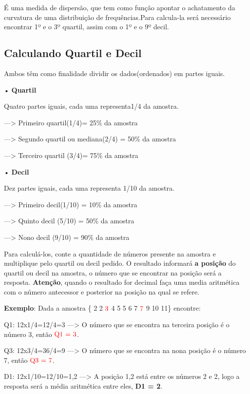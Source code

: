 \documentclass[]{book}
\begin{document}
É uma medida de dispersão, que tem como função apontar o achatamento da curvatura de uma distribuição de frequências.Para calcula-la será necessário encontrar 1º e o 3º quartil, assim com o 1º e o 9º decil.

\hypertarget{calculando-quartil-e-decil}{%
\subsection{\texorpdfstring{\textbf{Calculando Quartil e Decil}}{Calculando Quartil e Decil}}\label{calculando-quartil-e-decil}}

Ambos têm como finalidade dividir os dados(ordenados) em partes iguais.

• \textbf{Quartil}

Quatro partes iguais, cada uma representa1/4 da amostra.

---\textgreater{} Primeiro quartil(1/4)= 25\% da amostra

---\textgreater{} Segundo quartil ou mediana(2/4) = 50\% da amostra

---\textgreater{} Terceiro quartil (3/4)= 75\% da amostra

• \textbf{Decil}

Dez partes iguais, cada uma representa 1/10 da amostra.

---\textgreater{} Primeiro decil(1/10) = 10\% da amostra

---\textgreater{} Quinto decil (5/10) = 50\% da amostra

---\textgreater{} Nono decil (9/10) = 90\% da amostra

Para calculá-los, conte a quantidade de números presente na amostra e multiplique pelo quartil ou decil pedido. O resultado informará \textbf{a posição} do quartil ou decil na amostra, o número que se encontrar na posição será a resposta. \textbf{Atenção}, quando o resultado for decimal faça uma media aritmética com o número antecessor e posterior na posição na qual se refere.

\textbf{Exemplo}: Dada a amostra \{ 2 2 \(\color{red}{\text{3}}\) 4 5 5 6 7 \(\color{red}{\text{7}}\) 9 10 11\} encontre:

Q1: 12x1/4=12/4=3 ---\textgreater{} O número que se encontra na terceira posição é o número 3, então \(\color{red}{\text{Q1 = 3}}\).

Q3: 12x3/4=36/4=9 ---\textgreater{} O número que se encontra na nona posição é o número 7, então \(\color{red}{\text{Q3 = 7}}\).

D1: 12x1/10=12/10=1,2 ---\textgreater{} A posição 1,2 está entre os números 2 e 2, logo a resposta será a média aritmética entre eles, \textbf{D1 = 2}.
\end{document}
